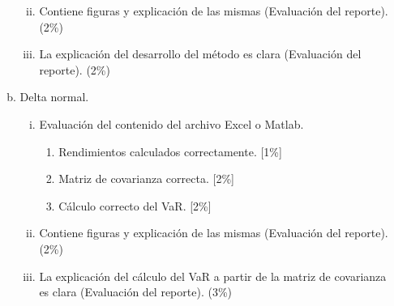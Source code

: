 \documentclass[12pt]{article}
\begin{document}
\begin{enumerate}[I.]
\begin{enumerate}[a)]
\begin{enumerate}[i)]
\begin{enumerate}
						\end{enumerate}
	\item Contiene figuras y explicaci\'on de las mismas (Evaluaci\'on del reporte). (2\%)
	\item La explicaci\'on del desarrollo del m\'etodo es clara (Evaluaci\'on del reporte). (2\%)
\end{enumerate}
	\item Delta normal.
			\begin{enumerate}[i)]
				\item Evaluaci\'on del contenido del archivo Excel o Matlab.
						\begin{enumerate}
							\item Rendimientos calculados correctamente. [1\%]
							\item Matriz de covarianza correcta. [2\%]
							\item C\'alculo correcto del VaR. [2\%]
						\end{enumerate}
				\item Contiene figuras y explicaci\'on de las mismas (Evaluaci\'on del reporte). (2\%)
				\item La explicaci\'on del c\'alculo del VaR a partir de la matriz de covarianza es clara (Evaluaci\'on del reporte). (3\%)
			\end{enumerate}
\end{enumerate}

\end{enumerate}
\end{document}
